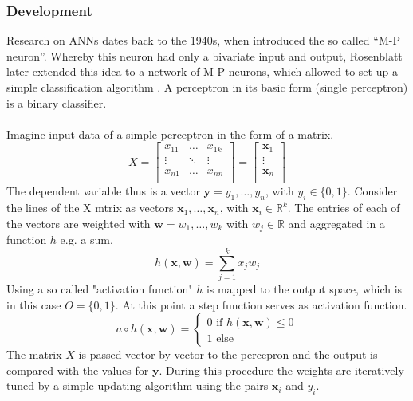 \documentclass[11pt,a4paper]{article}
\begin{document}
\subsubsection{Development}
Research on ANNs dates back to the 1940s, when \cite{McCulloch1943} introduced the so called “M-P neuron”. Whereby this neuron had only a bivariate input and output, Rosenblatt later extended this idea to a network of M-P neurons, which allowed to set up a simple classification algorithm \cite{Rb1958}. A perceptron in its basic form (single perceptron) is a binary classifier. \\
\\
Imagine input data of a simple perceptron in the form of a matrix. 
$$X= \left[
\begin{array}{rrr}                                
x_{11} & \dots & x_{1k} \\                                               
\vdots & \ddots & \vdots \\                                               
x_{n1} & \dots & x_{nn} \\                                             
\end{array}
\right] = \left[
\begin{array}{r}                                
\textbf{x}_{1} \\                                               
\vdots \\                                               
\textbf{x}_{n} \\                                             
\end{array}
\right]
$$ 
The dependent variable thus is a vector $\textbf{y}=y_1,…,y_n$, with $y_i\in \{0,1\}$. Consider the lines of the X mtrix as vectors $\textbf{x}_1,…,\textbf{x}_n$, with $\textbf{x}_i\in\mathbb{R}^k$. The entries of each of the vectors are weighted with $\textbf{w}=w_1,\dots,w_k$ with $w_j \in \mathbb{R}$ and aggregated in a function $h$ e.g. a sum.
$$h(\textbf{x},\textbf{w})=\sum_{j=1}^kx_jw_j$$
Using a so called "activation function" $h$ is mapped to the output space, which is in this case $O=\{0,1\}$. At this point a step function serves as activation function.
$$a \circ h(\textbf{x},\textbf{w}) = \begin{cases} 0 \text{ if } h(\textbf{x},\textbf{w}) \leq 0 \\ 1 \text{ else}\end{cases}$$
The matrix $X$ is passed vector by vector to the percepron and the output is compared with the values for $\textbf{y}$. During this procedure the weights are iteratively tuned by a simple updating algorithm using the pairs $\textbf{x}_i$ and $y_i.$
\end{document}
